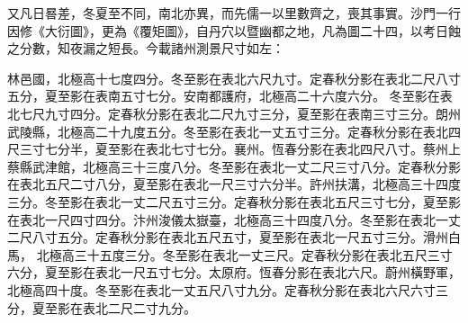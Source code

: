 \begin{pinyinscope}
 又凡日晷差，冬夏至不同，南北亦異，而先儒一以里數齊之，喪其事實。沙門一行因修《大衍圖》，更為《覆矩圖》，自丹穴以暨幽都之地，凡為圖二十四，以考日蝕之分數，知夜漏之短長。今載諸州測景尺寸如左：



 林邑國，北極高十七度四分。冬至影在表北六尺九寸。定春秋分影在表北二尺八寸五分，夏至影在表南五寸七分。安南都護府，北極高二十六度六分。
 冬至影在表北七尺九寸四分。定春秋分影在表北二尺九寸三分，夏至影在表南三寸三分。朗州武陵縣，北極高二十九度五分。冬至影在表北一丈五寸三分。定春秋分影在表北四尺三寸七分半，夏至影在表北七寸七分。襄州。恆春分影在表北四尺八寸。蔡州上蔡縣武津館，北極高三十三度八分。冬至影在表北一丈二尺三寸八分。定春秋分影在表北五尺二寸八分，夏至影在表北一尺三寸六分半。許州扶溝，北極高三十四度三分。冬至影在表北一丈二尺五寸三分。定春秋分影在表北五尺三寸七分，夏至影在表北一尺四寸四分。汴州浚儀太嶽臺，北極高三十四度八分。冬至影在表北一丈二尺八寸五分。定春秋分影在表北五尺五寸，夏至影在表北一尺五寸三分。滑州白馬，
 北極高三十五度三分。冬至影在表北一丈三尺。定春秋分影在表北五尺三寸六分，夏至影在表北一尺五寸七分。太原府。恆春分影在表北六尺。蔚州橫野軍，北極高四十度。冬至影在表北一丈五尺八寸九分。定春秋分影在表北六尺六寸三分，夏至影在表北二尺二寸九分。



\end{pinyinscope}